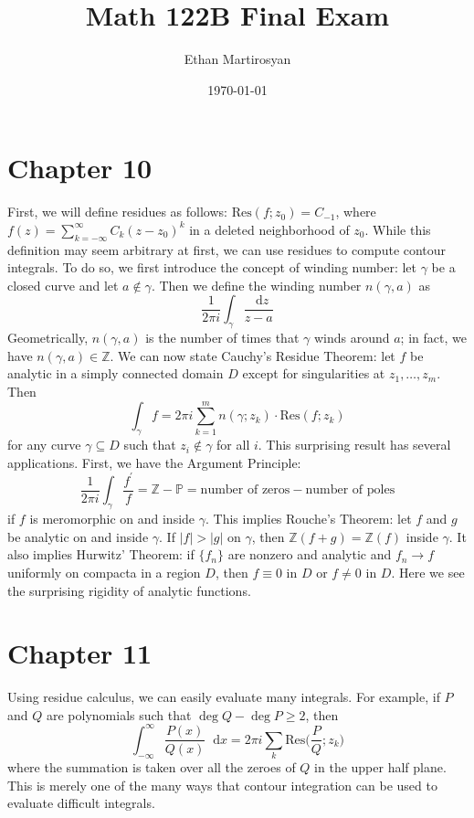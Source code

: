 \documentclass[12pt]{article}
\newcommand{\zz}{\mathbb Z}
\newcommand*\diff{\mathop{}\!\mathrm{d}}
\begin{document}
 
\title{Math 122B Final Exam}
\author{Ethan Martirosyan}
\date{\today}
\maketitle
{}
\hfuzz=50pt
\section*{Chapter 10}
First, we will define residues as follows: $\text{Res}(f;z_0) = C_{-1}$, where $f(z) = \sum_{k=-\infty}^\infty C_k (z - z_0)^k$ in a deleted neighborhood of $z_0$. While this definition may seem arbitrary at first, we can use residues to compute contour integrals. To do so, we first introduce the concept of winding number: let $\gamma$ be a closed curve and let $a \not \in \gamma$. Then we define the winding number $n(\gamma,a)$ as
\[
\frac{1}{2\pi i} \int_\gamma \frac{\diff z}{z-a}
\] Geometrically, $n(\gamma,a)$ is the number of times that $\gamma$ winds around $a$; in fact, we have $n(\gamma,a) \in \zz$. We can now state Cauchy's Residue Theorem: let $f$ be analytic in a simply connected domain $D$ except for singularities at $z_1,\ldots,z_m$. Then
\[
\int_\gamma f = 2\pi i \sum_{k=1}^m n(\gamma; z_k) \cdot \text{Res}(f;z_k)
\] for any curve $\gamma \subseteq D$ such that $z_i\not \in \gamma$ for all $i$. This surprising result has several applications. First, we have the Argument Principle:
\[
\frac{1}{2\pi i} \int_\gamma \frac{f^\prime}{f} = \zz - \mathbb{P} = \text{number of zeros} - \text{number of poles}
\] if $f$ is meromorphic on and inside $\gamma$. This implies Rouche's Theorem: let $f$ and $g$ be analytic on and inside $\gamma$. If $\vert f \vert > \vert g \vert$ on $\gamma$, then $\zz(f+g) = \zz(f)$ inside $\gamma$. It also implies Hurwitz' Theorem: if $\{f_n\}$ are nonzero and analytic and $f_n \rightarrow f$ uniformly on compacta in a region $D$, then $f \equiv 0$ in $D$ or $f \neq 0$ in $D$. Here we see the surprising rigidity of analytic functions.
\section*{Chapter 11}
Using residue calculus, we can easily evaluate many integrals. For example, if $P$ and $Q$ are polynomials such that $\deg Q - \deg P \geq 2$, then 
\[
\int_{-\infty}^\infty \frac{P(x)}{Q(x)} \diff x = 2\pi i \sum_{k} \text{Res}\bigg(\frac{P}{Q}; z_k\bigg)
\] where the summation is taken over all the zeroes of $Q$ in the upper half plane. This is merely one of the many ways that contour integration can be used to evaluate difficult integrals.
\end{document}
